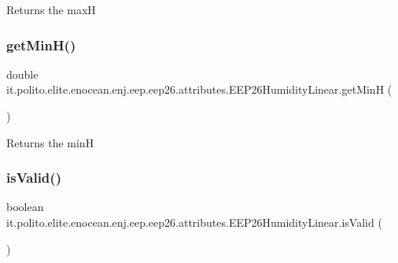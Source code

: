 \begin{DoxyReturn}{Returns}
the maxH 
\end{DoxyReturn}
\hypertarget{classit_1_1polito_1_1elite_1_1enocean_1_1enj_1_1eep_1_1eep26_1_1attributes_1_1_e_e_p26_humidity_linear_a85c72b92815e5006f3481743c200bae4}{}\label{classit_1_1polito_1_1elite_1_1enocean_1_1enj_1_1eep_1_1eep26_1_1attributes_1_1_e_e_p26_humidity_linear_a85c72b92815e5006f3481743c200bae4} 
\subsubsection{\texorpdfstring{get\+Min\+H()}{getMinH()}}
{\footnotesize\ttfamily double it.\+polito.\+elite.\+enocean.\+enj.\+eep.\+eep26.\+attributes.\+E\+E\+P26\+Humidity\+Linear.\+get\+MinH (\begin{DoxyParamCaption}{ }\end{DoxyParamCaption})}

\begin{DoxyReturn}{Returns}
the minH 
\end{DoxyReturn}
\hypertarget{classit_1_1polito_1_1elite_1_1enocean_1_1enj_1_1eep_1_1eep26_1_1attributes_1_1_e_e_p26_humidity_linear_ad9c926847cee0fe8301dc4c55bd98793}{}\label{classit_1_1polito_1_1elite_1_1enocean_1_1enj_1_1eep_1_1eep26_1_1attributes_1_1_e_e_p26_humidity_linear_ad9c926847cee0fe8301dc4c55bd98793} 
\subsubsection{\texorpdfstring{is\+Valid()}{isValid()}}
{\footnotesize\ttfamily boolean it.\+polito.\+elite.\+enocean.\+enj.\+eep.\+eep26.\+attributes.\+E\+E\+P26\+Humidity\+Linear.\+is\+Valid (\begin{DoxyParamCaption}{ }\end{DoxyParamCaption})}

